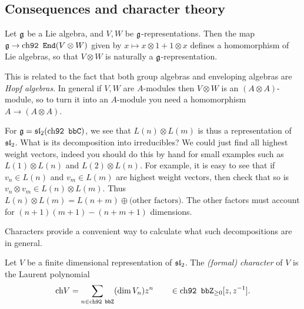\subsection{Consequences and character theory}
Let $\frakg$ be a Lie algebra, and $V,W$ be $\frakg$-representations. Then the
map $\frakg\to \End(V\otimes W)$ given by $x\mapsto x\otimes 1 + 1\otimes x$
defines a homomorphism of Lie algebras, so that $V\otimes W$ is naturally a
$\frakg$-representation.

\begin{remark}
    This is related to the fact that both group algebras and enveloping algebras
    are \emph{Hopf algebras}. In general if $V,W$ are $A$-modules then $V\otimes
    W$ is an $(A\otimes A)$-module, so to turn it into an $A$-module you need a
    homomorphism $A\to (A\otimes A)$.
\end{remark}

For $\frakg = \sl_2(\bbC)$, we see that $L(n)\otimes L(m)$ is thus a representation of
$\sl_2$. What is its decomposition into irreducibles? We could just find all
highest weight vectors, indeed you should do this by hand for small examples
such as $L(1)\otimes L(n)$ and $L(2)\otimes L(n)$. For example, it is easy to
see that if $v_n\in L(n)$ and $v_m\in L(m)$ are highest weight vectors, then
check that so is $v_n\otimes v_m \in L(n)\otimes L(m)$. Thus $L(n)\otimes L(m) =
L(n+m) \oplus \text{(other factors)}$. The other factors must account for $(n+1)(m+1)-(n+m+1)$ dimensions. 

Characters provide a convenient way to calculate what such decompositions are in
general.

\begin{definition}
    Let $V$ be a finite dimensional representation of $\sl_2$. The
    \emph{(formal) character} of $V$ is the Laurent polynomial
    \[\char V=\sum_{n\in \bbZ} (\dim V_n) z^n \qquad \in \bbZ_{\geq 0
    }[z,z^{-1}].\]
\end{definition}

